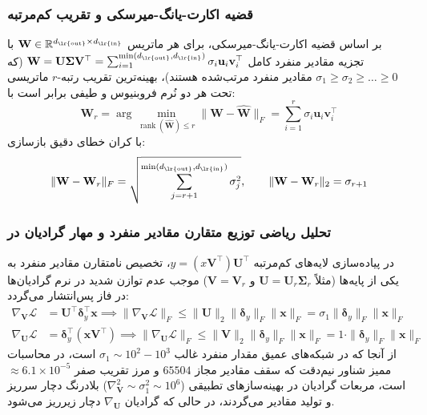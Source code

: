 \subsubsection*{قضیه اکارت-یانگ-میرسکی و تقریب کم‌مرتبه }
بر اساس قضیه اکارت-یانگ-میرسکی، برای هر ماتریس $\mathbf{W} \in \mathbb{R}^{d_{\text{\lr{out}}} \times d_{\text{\lr{in}}}}$ با تجزیه مقادیر منفرد کامل $\mathbf{W} = \mathbf{U}\mathbf{\Sigma}\mathbf{V}^\top = \sum_{i=1}^{\min(d_{\text{\lr{out}}}, d_{\text{\lr{in}}})} \sigma_i \mathbf{u}_i \mathbf{v}_i^\top$ (که $\sigma_1 \ge \sigma_2 \ge \dots \ge 0$ مقادیر منفرد مرتب‌شده هستند)، بهینه‌ترین تقریب رتبه-$r$ ماتریسی تحت هر دو نُرم فروبنیوس و طیفی برابر است با:
\begin{equation}
\mathbf{W}_r = \arg\min_{\operatorname{rank}(\hat{\mathbf{W}}) \le r} \|\mathbf{W} - \hat{\mathbf{W}}\|_F = \sum_{i=1}^r \sigma_i \mathbf{u}_i \mathbf{v}_i^\top
\end{equation}
با کران خطای دقیق بازسازی:
\begin{equation}
\|\mathbf{W} - \mathbf{W}_r\|_F = \sqrt{\sum_{j=r+1}^{\min(d_{\text{\lr{out}}}, d_{\text{\lr{in}}})} \sigma_j^2}, \qquad \|\mathbf{W} - \mathbf{W}_r\|_2 = \sigma_{r+1}
\end{equation}

\subsubsection*{تحلیل ریاضی توزیع متقارن مقادیر منفرد و مهار گرادیان در }
در پیاده‌سازی لایه‌های کم‌مرتبه $y = (x \mathbf{V}^\top)\mathbf{U}^\top$، تخصیص نامتقارن مقادیر منفرد به یکی از پایه‌ها (مثلاً $\mathbf{U} = \mathbf{U}_r \mathbf{\Sigma}_r$ و $\mathbf{V} = \mathbf{V}_r$) موجب عدم توازن شدید در نرم گرادیان‌ها در فاز پس‌انتشار می‌گردد:
\begin{align}
\nabla_{\mathbf{V}} \mathcal{L} &= \mathbf{U}^\top \boldsymbol{\delta}_y^\top \mathbf{x} \implies \|\nabla_{\mathbf{V}} \mathcal{L}\|_F \le \|\mathbf{U}\|_2 \|\boldsymbol{\delta}_y\|_F \|\mathbf{x}\|_F = \sigma_1 \|\boldsymbol{\delta}_y\|_F \|\mathbf{x}\|_F \\
\nabla_{\mathbf{U}} \mathcal{L} &= \boldsymbol{\delta}_y^\top (\mathbf{x} \mathbf{V}^\top) \implies \|\nabla_{\mathbf{U}} \mathcal{L}\|_F \le \|\mathbf{V}\|_2 \|\boldsymbol{\delta}_y\|_F \|\mathbf{x}\|_F = 1 \cdot \|\boldsymbol{\delta}_y\|_F \|\mathbf{x}\|_F
\end{align}
از آنجا که در شبکه‌های عمیق مقدار منفرد غالب $\sigma_1 \sim 10^2 - 10^3$ است، در محاسبات ممیز شناور نیم‌دقت  که سقف مقادیر مجاز $65504$ و مرز تقریب صفر $\approx 6.1 \times 10^{-5}$ است، مربعات گرادیان در بهینه‌سازهای تطبیقی ($\nabla_{\mathbf{V}}^2 \sim \sigma_1^2 \sim 10^6$) بلادرنگ دچار سرریز  و تولید مقادیر  می‌گردند، در حالی که گرادیان $\nabla_{\mathbf{U}}$ دچار زیرریز  می‌شود.

